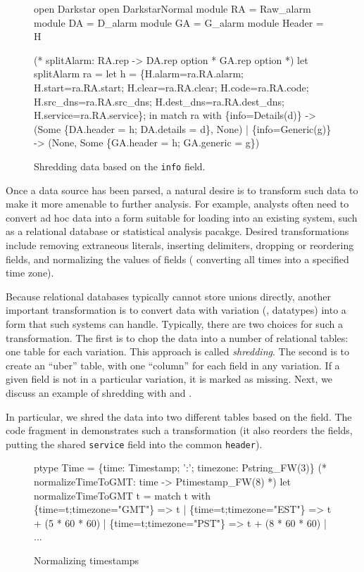 \begin{figure}
\begin{code}\scriptsize
open Darkstar
open DarkstarNormal
module RA = Raw\_alarm
module DA = D\_alarm
module GA = G\_alarm
module Header = H

(* splitAlarm: RA.rep -> DA.rep option * GA.rep option *)
let splitAlarm ra =
    let h = \{H.alarm=ra.RA.alarm; H.start=ra.RA.start; 
              H.clear=ra.RA.clear; H.code=ra.RA.code;
              H.src\_dns=ra.RA.src\_dns; H.dest\_dns=ra.RA.dest\_dns;
              H.service=ra.RA.service\};
    in match ra with
        \{info=Details(d)\} -> 
        (Some \{DA.header = h; DA.details = d\}, None)
      | \{info=Generic(g)\} ->
        (None, Some \{GA.header = h; GA.generic = g\})    
  \end{code}
  \caption{Shredding \darkstar{} data based on the {\tt info} field.}
  \label{fig:ex-no-err-check}
\end{figure}

Once a data source has been parsed, a natural desire is to transform
such data to make it more amenable to further analysis.  For example,
analysts often need to convert ad hoc data into a form suitable for
loading into an existing system, such as a relational database or
statistical analysis pacakge.  Desired transformations include
removing extraneous literals, inserting delimiters, dropping or
reordering fields, and normalizing the values of fields (\eg{}
converting all times into a specified time zone).  

Because relational databases typically cannot store unions directly,
another important transformation is to convert data with variation
(\ie{}, datatypes) into a form that such systems can handle.
Typically, there are two choices for such a transformation.  The first
is to chop the data into a number of relational tables: one table for
each variation.  This approach is called \textit{shredding}. The
second is to create an ``uber'' table, with one ``column'' for each
field in any variation.  If a given field is not in a particular
variation, it is marked as missing. Next, we discuss an example of
shredding with \padsml{} and \ocaml{}.

In particular, we shred the data into two different tables based on
the  field.  The code fragment in
 demonstrates such a transformation (it
also reorders the fields, putting the shared \texttt{service} field
into the common \texttt{header}).

\begin{figure}
  \centering
  \begin{code}\scriptsize
ptype Time = 
  \{time: Timestamp;
   ':'; timezone: Pstring_FW(3)\}
\mbox{}
(* normalizeTimeToGMT: time -> Ptimestamp_FW(8) *)
let normalizeTimeToGMT t = 
    match t with
      \{time=t;timezone="GMT"\} => t
    | \{time=t;timezone="EST"\} => t + (5 * 60 * 60)
    | \{time=t;timezone="PST"\} => t + (8 * 60 * 60)
    | ... \end{code}
  \caption{Normalizing timestamps}
  \label{fig:ex-normalize}
\end{figure}

